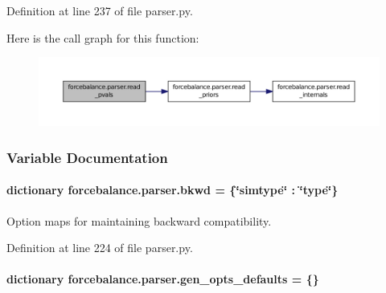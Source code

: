 Definition at line 237 of file parser.\-py.



Here is the call graph for this function\-:\nopagebreak
\begin{figure}[H]
\begin{center}
\leavevmode
\includegraphics[width=350pt]{namespaceforcebalance_1_1parser_a56fb1e139dad24bac29f25a3870765ca_cgraph}
\end{center}
\end{figure}




\subsubsection{Variable Documentation}
\hypertarget{namespaceforcebalance_1_1parser_a121eaaef101563523a8fb20bd5ace409}{
\paragraph[{bkwd}]{\setlength{\rightskip}{0pt plus 5cm}dictionary forcebalance.\-parser.\-bkwd = \{\char`\"{}simtype\char`\"{} \-: \char`\"{}type\char`\"{}\}}}\label{namespaceforcebalance_1_1parser_a121eaaef101563523a8fb20bd5ace409}


Option maps for maintaining backward compatibility. 



Definition at line 224 of file parser.\-py.

\hypertarget{namespaceforcebalance_1_1parser_a980fd024b1f2877247de482247250b9e}{
\paragraph[{gen\-\_\-opts\-\_\-defaults}]{\setlength{\rightskip}{0pt plus 5cm}dictionary forcebalance.\-parser.\-gen\-\_\-opts\-\_\-defaults = \{\}}}\label{namespaceforcebalance_1_1parser_a980fd024b1f2877247de482247250b9e}



